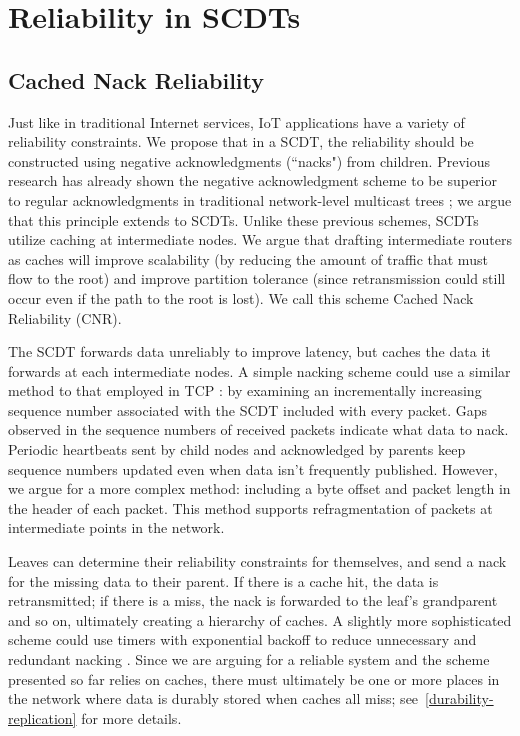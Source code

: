 \chapter{Reliability in SCDTs}

\section{Cached Nack Reliability}
Just like in traditional Internet services, IoT applications have a variety of
reliability constraints.  We propose that in a SCDT, the reliability should be
constructed using negative acknowledgments (``nacks") from children.  Previous
research has already shown the negative acknowledgment scheme to be superior to
regular acknowledgments in traditional network-level multicast trees
\cite{SRM, RFC3208}; we argue that this principle extends to SCDTs.
Unlike these previous schemes, SCDTs utilize caching at intermediate nodes.  We
argue that drafting intermediate routers as caches will improve scalability (by
reducing the amount of traffic that must flow to the root) and improve partition
tolerance (since retransmission could still occur even if the path to the root
is lost).  We call this scheme Cached Nack Reliability (CNR).

The SCDT forwards data unreliably to improve latency, but caches the data it
forwards at each intermediate nodes.  A simple nacking scheme could use a similar method to that employed in TCP \cite{RFC0793}: by examining an incrementally increasing sequence number associated with the SCDT included with every packet.  Gaps observed in the sequence numbers of received packets indicate what data to nack.  Periodic heartbeats sent by child nodes and acknowledged by parents keep sequence numbers updated even when data isn't frequently published.  However, we argue for a more complex method: including a byte offset and packet length in the header of each packet.  This method supports refragmentation of packets at intermediate points in the network.

Leaves can determine their reliability constraints for themselves, and send a
nack for the missing data to their parent.  If there is a cache hit, the data is
retransmitted; if there is a miss, the nack is forwarded to the leaf's
grandparent and so on, ultimately creating a hierarchy of caches.  A slightly
more sophisticated scheme could use timers with exponential backoff to reduce
unnecessary and redundant nacking \cite{SRM, RFC3208}.  Since we are
arguing for a reliable system and the scheme presented so far relies on caches,
there must ultimately be one or more places in the network where data is durably
stored when caches all miss; 
see~\autoref{durability-replication} for more
details.

